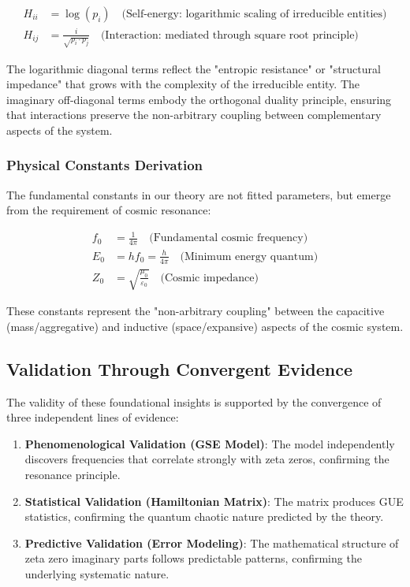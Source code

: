 \begin{align}
H_{ii} &= \log(p_i) \quad \text{(Self-energy: logarithmic scaling of irreducible entities)} \\
H_{ij} &= \frac{i}{\sqrt{p_i \cdot p_j}} \quad \text{(Interaction: mediated through square root principle)}
\end{align}

The logarithmic diagonal terms reflect the "entropic resistance" or "structural impedance" that grows with the complexity of the irreducible entity. The imaginary off-diagonal terms embody the orthogonal duality principle, ensuring that interactions preserve the non-arbitrary coupling between complementary aspects of the system.

\subsubsection{Physical Constants Derivation}

The fundamental constants in our theory are not fitted parameters, but emerge from the requirement of cosmic resonance:

\begin{align}
f_0 &= \frac{1}{4\pi} \quad \text{(Fundamental cosmic frequency)} \\
E_0 &= h f_0 = \frac{h}{4\pi} \quad \text{(Minimum energy quantum)} \\
Z_0 &= \sqrt{\frac{\mu_0}{\varepsilon_0}} \quad \text{(Cosmic impedance)}
\end{align}

These constants represent the "non-arbitrary coupling" between the capacitive (mass/aggregative) and inductive (space/expansive) aspects of the cosmic system.

\subsection{Validation Through Convergent Evidence}

The validity of these foundational insights is supported by the convergence of three independent lines of evidence:

\begin{enumerate}
\item \textbf{Phenomenological Validation (GSE Model)}: The model independently discovers frequencies that correlate strongly with zeta zeros, confirming the resonance principle.

\item \textbf{Statistical Validation (Hamiltonian Matrix)}: The matrix produces GUE statistics, confirming the quantum chaotic nature predicted by the theory.

\item \textbf{Predictive Validation (Error Modeling)}: The mathematical structure of zeta zero imaginary parts follows predictable patterns, confirming the underlying systematic nature.
\end{enumerate}

